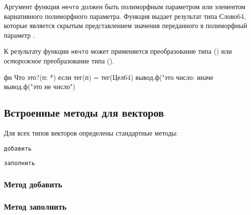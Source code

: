 \bigskip
Аргумент функция \verb+нечто+ должен быть полиморфным параметром или элементом вариативного полиморфного параметра. 
Функция выдает результат типа Слово64, которые является скрытым представлением значения переданного в полиморфный параметр .

К результату функции \verb+нечто+ может применяется преобразование типа () или \emph{осторожное} преобразование типа ().

\begin{Trivil}
фн Что это?(п: *) {
    если тег(п) = тег(Цел64) { 
        вывод.ф("это число: %
    }
    иначе { 
        вывод.ф("это не число") 
    }
}
\end{Trivil}

\hypertarget{stdvector}{%
\subsection{Встроенные методы для векторов}\label{stdfuncs:stdvector}}

Для всех типов векторов определены стандартные методы:
\begin{d_itemize}
\item
    \verb+добавить+
\item
    \verb+заполнить+
\end{d_itemize}


\hypertarget{vector-append}{%
\subsubsection{Метод добавить}\label{stdfuncs:vector-append}}


\hypertarget{vector-fill}{%
\subsubsection{Метод заполнить}\label{stdfuncs:vector-fill}}

